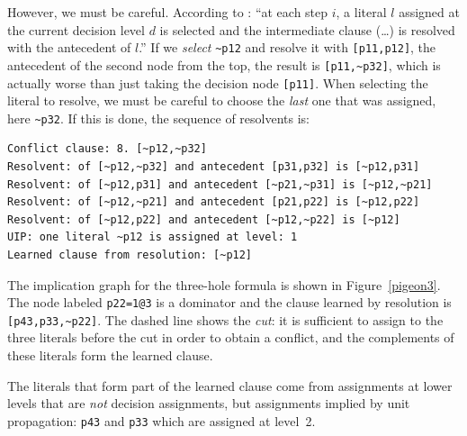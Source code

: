 \documentclass[11pt]{report}
\begin{document}
However, we must be careful. According to \cite[p.~137]{mlm}: ``at each
step $i$, a literal $l$ assigned at the current decision level $d$ is
selected and the intermediate clause (\ldots) is resolved with the
antecedent of $l$.'' If we \emph{select} \verb+~p12+ and resolve it with
\verb+[p11,p12]+, the antecedent of the second node from the top, the
result is \verb+[p11,~p32]+, which is actually worse than just taking
the decision node \verb+[p11]+. When selecting the literal to resolve,
we must be careful to choose the \emph{last} one that was assigned, here
\verb+~p32+. If this is done, the sequence of resolvents is:

\begin{verbatim}
Conflict clause: 8. [~p12,~p32]
Resolvent: of [~p12,~p32] and antecedent [p31,p32] is [~p12,p31]
Resolvent: of [~p12,p31] and antecedent [~p21,~p31] is [~p12,~p21]
Resolvent: of [~p12,~p21] and antecedent [p21,p22] is [~p12,p22]
Resolvent: of [~p12,p22] and antecedent [~p12,~p22] is [~p12]
UIP: one literal ~p12 is assigned at level: 1
Learned clause from resolution: [~p12]
\end{verbatim}

The implication graph for the three-hole formula is shown in
Figure~\ref{pigeon3}. The node labeled \verb+p22=1@3+ is a dominator and
the clause learned by resolution is \verb+[p43,p33,~p22]+. The dashed
line shows the \emph{cut}: it is sufficient to assign to the three
literals before the cut in order to obtain a conflict, and the
complements of these literals form the learned clause.

The literals that form part of the learned clause come from assignments
at lower levels that are \emph{not} decision assignments, but
assignments implied by unit propagation: \verb+p43+ and \verb+p33+ which
are assigned at level~2.
\end{document}
